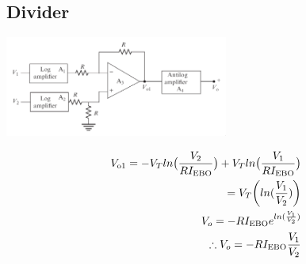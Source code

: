 \documentclass[a4paper, 12pt]{report}
\begin{document}
\begin{center}
\begin{center}
\begin{center}
\begin{center}
\begin{center}
\begin{center}
\begin{center}
\begin{center}
\begin{center}
\begin{center}
\begin{center}
\begin{center}
\begin{multicols}{2}
\section{Divider}
\begin{center}
    \includegraphics[width=0.55\textwidth]{figures/210c.png}
\end{center}
\begin{equation} \notag
    \begin{align}
        V_\text{o1} = -V_T ln\big(\frac{V_2}{RI_\text{EBO}}\big) + V_T ln\big(\frac{V_1}{RI_\text{EBO}}\big)\\
        = V_T\bigg(ln(\frac{V_1}{V_2})\bigg)\\
        V_o = -RI_\text{EBO}e^{ln(\frac{V_1}{V_2})}\\
        \therefore V_o = -RI_\text{EBO} \frac{V_1}{V_2}
        \\
        \\
    \end{align}
\end{equation}
\end{multicols}

\end{center}
\end{center}
\end{center}
\end{center}
\end{center}
\end{center}
\end{center}
\end{center}
\end{center}
\end{center}
\end{center}
\end{center}
\end{document}
